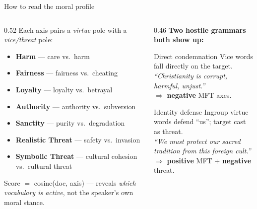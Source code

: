 \documentclass[aspectratio=169,10pt]{beamer}
\begin{document}
\begin{frame}{How to read the moral profile}
  \small
  \begin{columns}[T,onlytextwidth]
    \begin{column}{0.52\textwidth}
      Each axis pairs a \emph{virtue} pole with a \emph{vice/threat} pole:
      \vspace{0.2em}
      \begin{itemize}\footnotesize
        \item \textbf{Harm} — care vs.\ harm
        \item \textbf{Fairness} — fairness vs.\ cheating
        \item \textbf{Loyalty} — loyalty vs.\ betrayal
        \item \textbf{Authority} — authority vs.\ subversion
        \item \textbf{Sanctity} — purity vs.\ degradation
        \item \textbf{Realistic Threat} — safety vs.\ invasion
        \item \textbf{Symbolic Threat} — cultural cohesion vs.\ cultural threat
      \end{itemize}
      \vspace{0.3em}
      \textcolor{mutedgray}{\footnotesize
        Score $=$ cosine(doc, axis) — reveals \emph{which vocabulary is active},
        not the speaker's own moral stance.}
    \end{column}
    \begin{column}{0.46\textwidth}\footnotesize
      \textbf{Two hostile grammars both show up:}
      \vspace{0.3em}
      \begin{block}{Direct condemnation}
      Vice words fall directly on the target.\\
      \emph{``Christianity is corrupt, harmful, unjust.''}\\
      $\Rightarrow$ \textbf{negative} MFT axes.
      \end{block}
      \begin{block}{Identity defense}
      Ingroup virtue words defend ``us''; target cast as threat.\\
      \emph{``We must protect our sacred tradition from this foreign cult.''}\\
      $\Rightarrow$ \textbf{positive} MFT + \textbf{negative} threat.
      \end{block}
    \end{column}
  \end{columns}
\end{frame}
\end{document}
